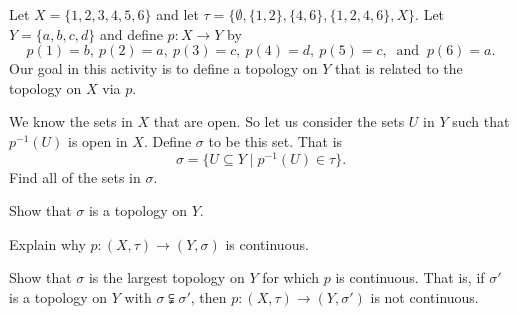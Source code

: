 \begin{pa} Let $X = \{1,2,3,4,5,6\}$ and let $\tau = \{\emptyset, \{1,2\},\{4,6\}, \{1,2,4,6\},X\}$. Let $Y = \{a,b,c,d\}$ and define $p: X \to Y$ by 
\[p(1) = b, \ p(2) = a, \ p(3) = c, \ p(4) = d, \ p(5) = c, \ \text{ and } \ p(6) = a.\] 
Our goal in this activity is to define a topology on $Y$ that is related to the topology on $X$ via $p$. 
\be
\item We know the sets in $X$ that are open. So let us consider the sets $U$ in $Y$ such that $p^{-1}(U)$ is open in $X$. Define $\sigma$ to be this set. That is
\[\sigma = \{U \subseteq Y \mid p^{-1}(U) \in \tau\}.\]
Find all of the sets in $\sigma$. 

\item Show that $\sigma$ is a topology on $Y$.

\item Explain why $p : (X, \tau) \to (Y, \sigma)$ is continuous.

\item Show that $\sigma$ is the largest topology on $Y$ for which $p$ is continuous. That is, if $\sigma'$ is a topology on $Y$ with $\sigma \subsetneqq \sigma'$, then $p: (X,\tau) \to (Y, \sigma')$ is not continuous.

\ee

\end{pa}

